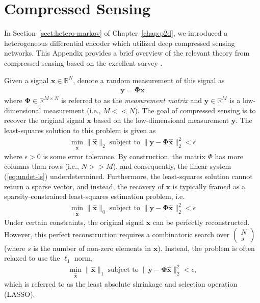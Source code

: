 \chapter{Compressed Sensing}
\label{appdx:compressed-sensing}

In Section~\ref{sect:hetero-markov} of Chapter~\ref{chap:p2d}, we introduced a heterogeneous differential encoder which utilized deep compressed sensing networks. This Appendix provides a brief overview of the relevant theory from compressed sensing based on the excellent survey \cite{ref:Marques2019ReviewOfSparseRecovery}.

Given a signal $\mathbf{x}\in\mathbb{R}^N$, denote a random measurement of this signal as 
\begin{align*}
    \mathbf{y} = \mathbf{\Phi}\mathbf{x}
\end{align*}
where $\mathbf{\Phi}\in\mathbb{R}^{M\times N}$ is referred to as the \emph{measurement matrix} and $\mathbf{y}\in\mathbb{R}^{M}$ is a low-dimensional measurement (i.e., $M << N$). The goal of compressed sensing is to recover the original signal $\mathbf{x}$ based on the low-dimensional measurement $\mathbf{y}$. The least-squares solution to this problem is given as
\begin{align}
    \min_{\hat{\mathbf{x}}}\|\hat{\mathbf{x}}\|_2 \; \text{subject to} \; \|\mathbf{y} - \mathbf{\Phi}\hat{\mathbf{x}}\|_2^2 < \epsilon \label{eq:undet-ls}
\end{align}
where $\epsilon > 0$ is some error tolerance. By construction, the matrix $\Phi$ has more columns than rows (i.e., $N >> M$), and consequently, the linear system (\ref{eq:undet-ls}) underdetermined. Furthermore, the least-squares solution cannot return a sparse vector, and instead, the recovery of $\mathbf{x}$ is typically framed as a sparsity-constrained least-squares estimation problem, i.e.
\begin{align}
    \min_{\hat{\mathbf{x}}}\|\hat{\mathbf{x}}\|_0 \; \text{subject to} \; \|\mathbf{y} - \mathbf{\Phi}\hat{\mathbf{x}}\|_2^2 < \epsilon \label{eq:sparse-ls}
\end{align}
Under certain constraints, the original signal $\mathbf{x}$ can be perfectly reconstructed. However, this perfect reconstruction requires a combinatoric search over $\begin{pmatrix}N \\ s\end{pmatrix}$ (where $s$ is the number of non-zero elements in $\mathbf{x}$).
Instead, the problem is often relaxed to use the $\ell_1$ norm,
\begin{align}
    \min_{\hat{\mathbf{x}}}\|\hat{\mathbf{x}}\|_1 \; \text{subject to} \; \|\mathbf{y} - \mathbf{\Phi}\hat{\mathbf{x}}\|_2^2 < \epsilon, \label{eq:lasso-ls}
\end{align}
which is referred to as the least absolute shrinkage and selection operation (LASSO). 

